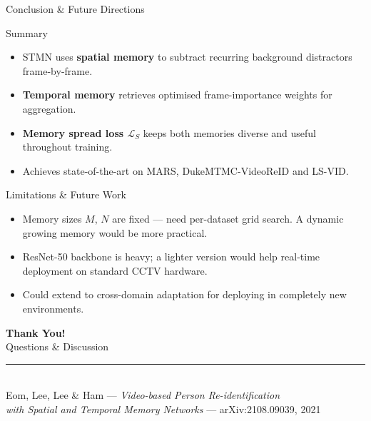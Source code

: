 \documentclass[aspectratio=169]{beamer}
\newcommand{\bt}[1]{\textbf{#1}}
\begin{document}
\begin{frame}{Conclusion \& Future Directions}
  \begin{block}{Summary}
    \begin{itemize}\setlength\itemsep{2pt}
      \item STMN uses \bt{spatial memory} to subtract recurring background distractors frame-by-frame.
      \item \bt{Temporal memory} retrieves optimised frame-importance weights for aggregation.
      \item \bt{Memory spread loss $\mathcal{L}_S$} keeps both memories diverse and useful throughout training.
      \item Achieves state-of-the-art on MARS, DukeMTMC-VideoReID and LS-VID.
    \end{itemize}
  \end{block}

  \begin{alertblock}{Limitations \& Future Work}
    \small
    \begin{itemize}\setlength\itemsep{2pt}
      \item Memory sizes $M$, $N$ are fixed --- need per-dataset grid search. A dynamic growing memory would be more practical.
      \item ResNet-50 backbone is heavy; a lighter version would help real-time deployment on standard CCTV hardware.
      \item Could extend to cross-domain adaptation for deploying in completely new environments.
    \end{itemize}
  \end{alertblock}
\end{frame}

{
\begin{frame}
  \vfill
  \begin{center}
    {\Huge \textcolor{iitgblue}{\textbf{Thank You!}}}\\[0.8em]
    {\Large Questions \& Discussion}\\[1.5em]
    \textcolor{iitggold}{\rule{0.5\textwidth}{0.8pt}}\\[0.8em]
    {\footnotesize
      Eom, Lee, Lee \& Ham --- \textit{Video-based Person Re-identification}\\
      \textit{with Spatial and Temporal Memory Networks} --- arXiv:2108.09039, 2021
    }
  \end{center}
  \vfill
\end{frame}
}
\end{document}
